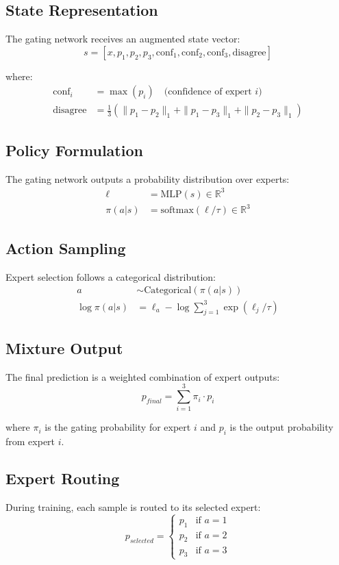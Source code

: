 \documentclass[11pt]{article}
\begin{document}
\subsection{State Representation}
The gating network receives an augmented state vector:
\begin{equation}
    s = [x, p_1, p_2, p_3, \text{conf}_1, \text{conf}_2, \text{conf}_3, \text{disagree}]
\end{equation}

where:
\begin{align}
    \text{conf}_i &= \max(p_i) \quad \text{(confidence of expert } i\text{)} \\
    \text{disagree} &= \frac{1}{3} \left( \|p_1 - p_2\|_1 + \|p_1 - p_3\|_1 + \|p_2 - p_3\|_1 \right)
\end{align}

\subsection{Policy Formulation}
The gating network outputs a probability distribution over experts:
\begin{align}
    \ell &= \text{MLP}(s) \in \mathbb{R}^3 \\
    \pi(a|s) &= \text{softmax}(\ell/\tau) \in \mathbb{R}^3
\end{align}

\subsection{Action Sampling}
Expert selection follows a categorical distribution:
\begin{align}
    a &\sim \text{Categorical}(\pi(a|s)) \\
    \log \pi(a|s) &= \ell_a - \log \sum_{j=1}^3 \exp(\ell_j/\tau)
\end{align}

\subsection{Mixture Output}
The final prediction is a weighted combination of expert outputs:
\begin{equation}
    p_{final} = \sum_{i=1}^3 \pi_i \cdot p_i
\end{equation}

where $\pi_i$ is the gating probability for expert $i$ and $p_i$ is the output probability from expert $i$.

\subsection{Expert Routing}
During training, each sample is routed to its selected expert:
\begin{equation}
    p_{selected} = \begin{cases}
        p_1 & \text{if } a = 1 \\
        p_2 & \text{if } a = 2 \\
        p_3 & \text{if } a = 3
    \end{cases}
\end{equation}
\end{document}

